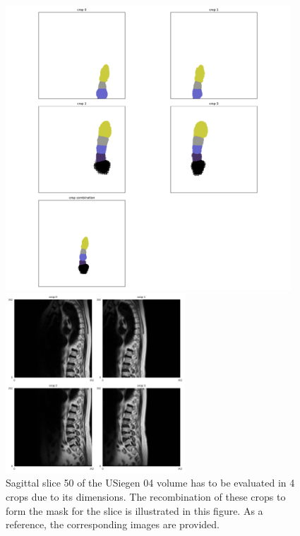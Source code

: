 \begin{figure}
\centering
\begin{minipage}{.99\textwidth}
    \includegraphics[width=0.95\textwidth]{images/USiegen_004_50_crops.pdf}
\end{minipage}
\begin{minipage}{.99\textwidth}
    \includegraphics[width=0.60\textwidth]{images/cropping_slice050.pdf}
\end{minipage}
    \caption{Sagittal slice 50 of the USiegen 04 volume has to be evaluated in 4 crops due to its dimensions. The recombination of these crops to form the mask for the slice is illustrated in this figure. As a reference, the corresponding images are provided.}
\end{figure}

